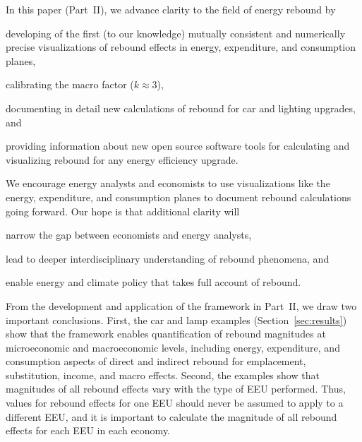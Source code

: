 \documentclass[12pt]{article}\usepackage[]{graphicx}\usepackage[]{xcolor}
\begin{document}
In this paper (Part~II), we advance clarity to the field of energy rebound
by 
%
\begin{enumerate*}[label={(\roman*)}]
	
  \item developing of the first (to our knowledge) 
        mutually consistent and numerically precise
        visualizations of rebound effects
        in energy, expenditure, and consumption planes, 
        
  \item calibrating the macro factor ($k \approx 3$),

  \item documenting in detail new calculations of rebound for car and lighting  
        upgrades, and 
        
  \item providing information about new open source software tools
        for calculating and visualizing rebound 
        for any energy efficiency upgrade.
  
\end{enumerate*}
%
We encourage energy analysts and economists to use visualizations
like the energy, expenditure, and consumption planes
to document rebound calculations going forward.
Our hope is that additional clarity will 
%
\begin{enumerate*}[label={(\roman*)}]
	
  \item narrow the gap between economists and energy analysts,
  
  \item lead to deeper interdisciplinary understanding of rebound phenomena, and
  
  \item enable energy and climate policy
        that takes full account of rebound.

\end{enumerate*}

From the development and application of the framework in Part~II, 
we draw two important conclusions.
First, the car and lamp examples (Section~\ref{sec:results}) show that
        the framework enables
        quantification of rebound magnitudes at microeconomic and macroeconomic levels, including 
        energy, expenditure, and consumption aspects of 
        direct and indirect rebound 
        for emplacement, substitution, income, and macro effects.
Second, the examples show that magnitudes of all rebound effects
        vary with the type of EEU performed.
Thus, values for rebound effects  
for one EEU should never be assumed to apply to a different EEU, and
it is important to calculate the magnitude of all rebound effects 
for each EEU in each economy.
\end{document}
